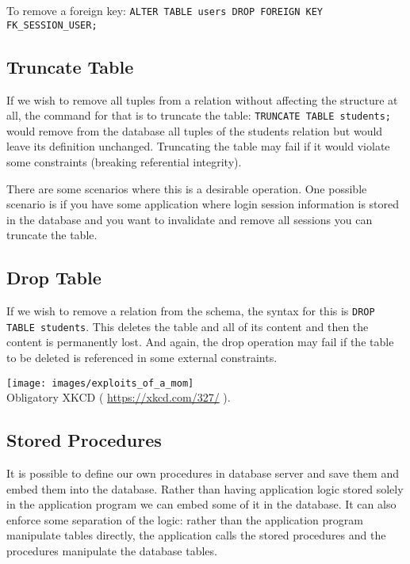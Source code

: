 \documentclass[a4paper]{report}
\begin{document}
To remove a foreign key: \texttt{ALTER TABLE users DROP FOREIGN KEY FK\_SESSION\_USER;}


\subsection*{Truncate Table}

If we wish to remove all tuples from a relation without affecting the structure at all, the command for that is to truncate the table: \texttt{TRUNCATE TABLE students;} would remove from the database all tuples of the students relation but would leave its definition unchanged. Truncating the table may fail if it would violate some constraints (breaking referential integrity).

There are some scenarios where this is a desirable operation. One possible scenario is if you have some application where login session information is stored in the database and you want to invalidate and remove all sessions you can truncate the table.

\subsection*{Drop Table}

If we wish to remove a relation from the schema, the syntax for this is \texttt{DROP TABLE students}. This deletes the table and all of its content and then the content is permanently lost. And again, the drop operation may fail if the table to be deleted is referenced in some external constraints.

\begin{center}
\texttt{[image: images/exploits\_of\_a\_mom]}\\
Obligatory XKCD ( \url{https://xkcd.com/327/} ).
\end{center}

\subsection*{Stored Procedures}
It is possible to define our own procedures in database server and save them and embed them into the database. Rather than having application logic stored solely in the application program we can embed some of it in the database. It can also enforce some separation of the logic: rather than the application program manipulate tables directly, the application calls the stored procedures and the procedures manipulate the database tables.
\end{document}
